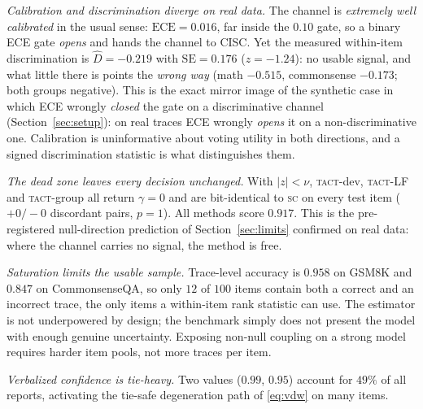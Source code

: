 \documentclass{article}
\newcommand{\Dhat}{\widehat{D}}
\newcommand{\SC}{\textsc{sc}}
\newcommand{\TACT}{\textsc{tact}}
\begin{document}
\emph{Calibration and discrimination diverge on real data.} The channel is \emph{extremely well calibrated}
in the usual sense: $\mathrm{ECE}=0.016$, far inside the $0.10$ gate, so a
binary ECE gate \emph{opens} and hands the channel to CISC. Yet the measured
within-item discrimination is $\Dhat=-0.219$ with $\mathrm{SE}=0.176$
($z=-1.24$): no usable signal, and what little there is points the
\emph{wrong way} (math $-0.515$, commonsense $-0.173$; both groups negative).
This is the exact mirror image of the synthetic case in which ECE wrongly
\emph{closed} the gate on a discriminative channel (Section~\ref{sec:setup}):
on real traces ECE wrongly \emph{opens} it on a non-discriminative one.
Calibration is uninformative about voting utility in both directions, and a
signed discrimination statistic is what distinguishes them.

\emph{The dead zone leaves every decision unchanged.} With $|z|<\nu$,
\TACT-dev, \TACT-LF and \TACT-group all return $\gamma=0$ and are bit-identical
to \SC{} on every test item ($+0/-0$ discordant pairs, $p=1$). All methods score
$0.917$. This is the pre-registered null-direction prediction of
Section~\ref{sec:limits} confirmed on real data: where the channel carries no
signal, the method is free.

\emph{Saturation limits the usable sample.} Trace-level
accuracy is $0.958$ on GSM8K and $0.847$ on CommonsenseQA, so only $12$ of $100$
items contain both a correct and an incorrect trace, the only items a
within-item rank statistic can use. The estimator is not underpowered by
design; the benchmark simply does not present the model with enough genuine
uncertainty. Exposing non-null coupling on a strong model requires harder item
pools, not more traces per item.

\emph{Verbalized confidence is tie-heavy.} Two values ($0.99$, $0.95$)
account for $49\%$ of all reports, activating the tie-safe degeneration path of
\eqref{eq:vdw} on many items.
\end{document}
